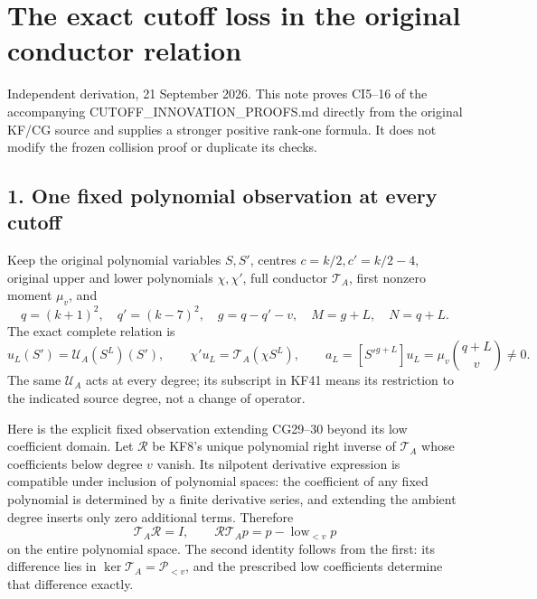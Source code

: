 \documentclass[11pt]{article}
\begin{document}
\section{The exact cutoff loss in the original conductor relation}\label{the-exact-cutoff-loss-in-the-original-conductor-relation}

Independent derivation, 21 September 2026. This note proves CI5--16 of the accompanying CUTOFF\_INNOVATION\_PROOFS.md directly from the original KF/CG source and supplies a stronger positive rank-one formula. It does not modify the frozen collision proof or duplicate its checks.

\subsection{1. One fixed polynomial observation at every cutoff}\label{one-fixed-polynomial-observation-at-every-cutoff}

Keep the original polynomial variables \(S,S'\), centres \(c=k/2,c'=k/2-4\), original upper and lower polynomials \(\chi,\chi'\), full conductor \(\mathcal T_A\), first nonzero moment \(\mu_v\), and \[
q=(k+1)^2,\quad q'=(k-7)^2,\quad
g=q-q'-v,\quad M=g+L,\quad N=q+L.
\] The exact complete relation is \[
u_L(S')=\mathcal U_A(S^L)(S'),\qquad
\chi'u_L=\mathcal T_A(\chi S^L),\qquad
a_L=[S'^{g+L}]u_L=\mu_v\binom{q+L}{v}\ne0.
\tag{CL1}
\] The same \(\mathcal U_A\) acts at every degree; its subscript in KF41 means its restriction to the indicated source degree, not a change of operator.

Here is the explicit fixed observation extending CG29--30 beyond its low coefficient domain. Let \(\mathcal R\) be KF8's unique polynomial right inverse of \(\mathcal T_A\) whose coefficients below degree \(v\) vanish. Its nilpotent derivative expression is compatible under inclusion of polynomial spaces: the coefficient of any fixed polynomial is determined by a finite derivative series, and extending the ambient degree inserts only zero additional terms. Therefore \[
\mathcal T_A\mathcal R=I,\qquad
\mathcal R\mathcal T_Ap=p-\operatorname{low}_{<v}p
\tag{CL2}
\] on the entire polynomial space. The second identity follows from the first: its difference lies in \(\ker\mathcal T_A=\mathcal P_{<v}\), and the prescribed low coefficients determine that difference exactly.
\end{document}
